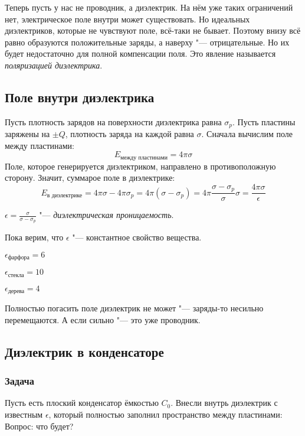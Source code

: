 		Теперь пусть у нас не проводник, а диэлектрик.
		На нём уже таких ограничений нет, электрическое поле внутри может существовать.
		Но идеальных диэлектриков, которые не чувствуют поле, всё-таки не бывает.
		Поэтому внизу всё равно образуются положительные заряды, а наверху "--- отрицательные.
		Но их будет недостаточно для полной компенсации поля.
		Это явление называется \textit{поляризацией диэлектрика}.

	\subsection{Поле внутри диэлектрика}
		Пусть плотность зарядов на поверхности диэлектрика равна $\sigma_p$.
		Пусть пластины заряжены на $\pm Q$, плотность заряда на каждой равна $\sigma$.
		Сначала вычислим поле между пластинами:
		\[E_{\text{между пластинами}} = 4\pi \sigma\]
		Поле, которое генерируется диэлектриком, направлено в противоположную сторону.
		Значит, суммарое поле в диэлектрике:
		\[ E_\text{в диэлектрике}
			= 4\pi\sigma - 4\pi\sigma_p
			= 4\pi(\sigma - \sigma_p)
			= 4\pi\frac{\sigma - \sigma_p}{\sigma}\sigma
			= \frac{4\pi\sigma}{\epsilon}
		\]
		\begin{Def}
			$\epsilon = \frac{\sigma}{\sigma - \sigma_p}$ "--- \textit{диэлектрическая проницаемость}.
		\end{Def}
		\begin{Rem}
			Пока верим, что $\epsilon$ "--- константное свойство вещества.
		\end{Rem}
		\begin{exmp}$\epsilon_\text{фарфора} = 6$\end{exmp}
		\begin{exmp}$\epsilon_\text{стекла} = 10$\end{exmp}
		\begin{exmp}$\epsilon_\text{дерева} = 4$\end{exmp}
		\begin{Rem}
			Полностью погасить поле диэлектрик не может "--- заряды-то несильно перемещаются.
			А если сильно "--- это уже проводник.
		\end{Rem}

	\subsection{Диэлектрик в конденсаторе}
		\subsubsection{Задача}
			Пусть есть плоский конденсатор ёмкостью $C_0$.
			Внесли внутрь диэлектрик с известным $\epsilon$, который полностью заполнил пространство между пластинами:
			Вопрос: что будет?


